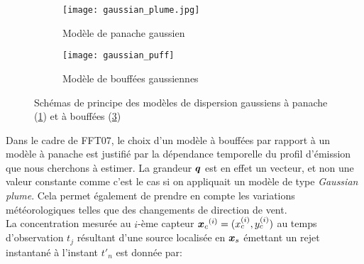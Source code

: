  \begin{figure}[h!]
 	\label{fig_gaussian_models}	
 	\centering
 	\begin{subfigure}[t]{0.5\textwidth}
 		\centering
 		\texttt{[image: gaussian\_plume.jpg]}
 		\caption{Modèle de panache gaussien \cite{Schulze1996}}
 		\label{gaussian_plume}
 	\end{subfigure}%
 	\begin{subfigure}[t]{0.5\textwidth}
 		\centering
 		\texttt{[image: gaussian\_puff]}
 		\caption{Modèle de bouffées gaussiennes}
 		\label{gaussian_puff}
 	\end{subfigure}
 	
 	\caption{Schémas de principe des modèles de dispersion gaussiens à panache (\ref{gaussian_plume}) et à bouffées (\ref{gaussian_puff})}
 \end{figure}
 
 Dans le cadre de FFT07, le choix d'un modèle à bouffées par rapport à un modèle à panache est justifié par la dépendance temporelle du profil d'émission que nous cherchons à estimer. La grandeur ${\bm{q}}$ est en effet un vecteur, et non une valeur constante comme c'est le cas si on appliquait un modèle de type \textit{Gaussian plume}. Cela permet également de prendre en compte les variations météorologiques telles que des changements de direction de vent. \\
 
 La concentration mesurée au $i$-ème capteur ${\bm{x}_c}^{(i)} = (x_c^{(i)}, y_c^{(i)})$ au temps d'observation $t_j$ résultant d'une source localisée en ${\bm{x}_s}$ émettant un rejet instantané à l'instant $t'_n$ est donnée par: 
 
